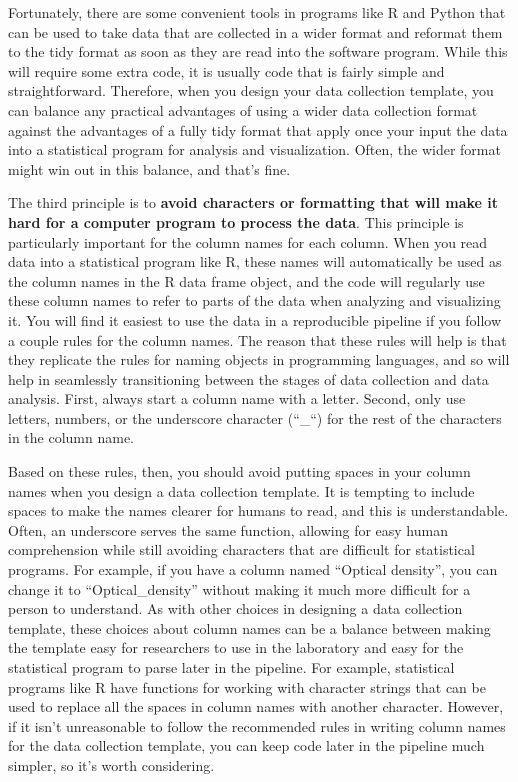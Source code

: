 \documentclass[]{tufte-book}
\begin{document}
Fortunately, there are some convenient tools in programs like R and Python that
can be used to take data that are collected in a wider format and reformat them
to the tidy format as soon as they are read into the software program. While
this will require some extra code, it is usually code that is fairly simple and
straightforward. Therefore, when you design your data collection template, you
can balance any practical advantages of using a wider data collection format
against the advantages of a fully tidy format that apply once your input the
data into a statistical program for analysis and visualization. Often, the wider
format might win out in this balance, and that's fine.

The third principle is to \textbf{avoid characters or formatting that will make it
hard for a computer program to process the data}. This principle is
particularly important for the column names for each column. When you read data
into a statistical program like R, these names will automatically be used as the
column names in the R data frame object, and the code will regularly use these
column names to refer to parts of the data when analyzing and visualizing it.
You will find it easiest to use the data in a reproducible pipeline if you
follow a couple rules for the column names. The reason that these rules will help
is that they replicate the rules for naming objects in programming languages,
and so will help in seamlessly transitioning between the stages of data
collection and data analysis. First, always start a column name with a letter.
Second, only use letters, numbers, or the underscore character (``\_``) for
the rest of the characters in the column name.

Based on these rules, then, you should avoid putting spaces in your column names
when you design a data collection template. It is tempting to include spaces to
make the names clearer for humans to read, and this is understandable. Often,
an underscore serves the same function, allowing for easy human comprehension
while still avoiding characters that are difficult for statistical programs.
For example, if you have a column named ``Optical density'', you can change it
to ``Optical\_density'' without making it much more difficult for a person to
understand. As with other choices in designing a data collection template,
these choices about column names can be a balance between making the template
easy for researchers to use in the laboratory and easy for the statistical
program to parse later in the pipeline. For example, statistical programs like
R have functions for working with character strings that can be used to
replace all the spaces in column names with another character. However, if
it isn't unreasonable to follow the recommended rules in writing column names
for the data collection template, you can keep code later in the pipeline
much simpler, so it's worth considering.
\end{document}
